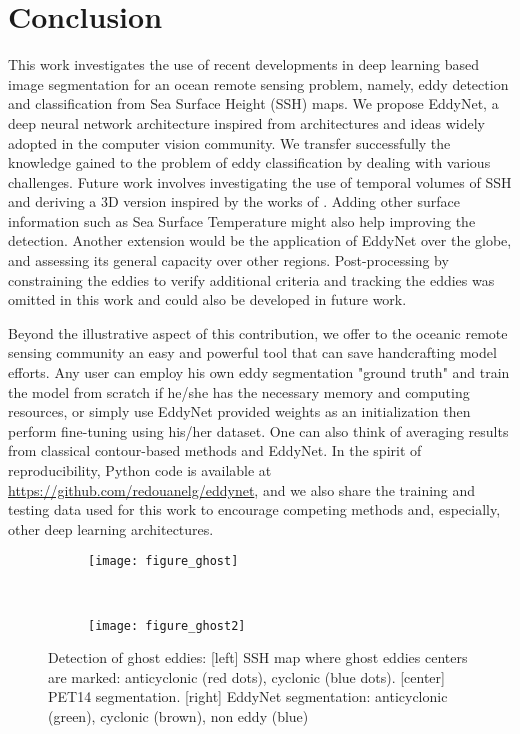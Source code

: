 \documentclass[journal]{IEEEtran}
\begin{document}
\section{Conclusion}
This work investigates the use of recent developments in deep learning based image segmentation for an ocean remote sensing problem, namely, eddy detection and classification from Sea Surface Height (SSH) maps. We propose EddyNet, a deep neural network architecture inspired from architectures and ideas widely adopted in the computer vision community. We transfer successfully the knowledge gained to the problem of eddy classification by dealing with various challenges. Future work involves investigating the use of temporal volumes of SSH and deriving a 3D version inspired by the works of \cite{milletari2016v}. Adding other surface information such as Sea Surface Temperature might also help improving the detection. Another extension would be the application of EddyNet over the globe, and assessing its general capacity over other regions. Post-processing by constraining the eddies to verify additional criteria and tracking the eddies was omitted in this work and could also be developed in future work.  

Beyond the illustrative aspect of this contribution, we offer to the oceanic remote sensing community an easy and powerful tool that can save handcrafting model efforts. Any user can employ his own eddy segmentation "ground truth" and train the model from scratch if he/she has the necessary memory and computing resources, or simply use EddyNet provided weights as an initialization then perform fine-tuning using his/her dataset. One can also think of averaging results from classical contour-based methods and EddyNet. In the spirit of reproducibility, Python code is available at \url{https://github.com/redouanelg/eddynet}, and we also share the training and testing data used for this work to encourage competing methods and, especially, other deep learning architectures.


\begin{figure}
    \centering
    \begin{subfigure}[b]{0.5\textwidth}
       \texttt{[image: figure\_ghost]}
       \caption{}\label{fig:ghost1}
    \end{subfigure}
    ~ 
    \begin{subfigure}[b]{0.5\textwidth}
       \texttt{[image: figure\_ghost2]}
       \caption{}\label{fig:ghost2}
    \end{subfigure}
\caption{Detection of ghost eddies: [left] SSH map where ghost eddies centers are marked: anticyclonic (red dots), cyclonic (blue dots). [center] PET14 segmentation. [right] EddyNet segmentation: anticyclonic (green), cyclonic (brown), non eddy (blue)}
\label{fig:ghost}
\end{figure}
\end{document}
